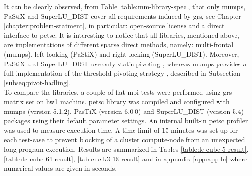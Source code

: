 It can be clearly observed, from Table \ref{table:mm-library-spec}, that only \acrshort{mumps}, PaStiX and SuperLU\_DIST cover all requirements induced by \acrshort{grs}, see Chapter \ref{chapter:problem-statment}, in particular: open-source license and a direct interface to \acrshort{petsc}. It is interesting to notice that all libraries, mentioned above, are implementations of different sparse direct methods, namely: multi-frontal (\acrshort{mumps}), left-looking (PaStiX) and right-locking (SuperLU\_DIST). Moreover, PaStiX and SuperLU\_DIST use only static pivoting \cite{pastix-manual}, \cite{superlu-manual} whereas \acrshort{mumps} provides a full implementation of the threshold pivoting strategy \cite{mumps-manual}, described in Subsection \ref{subseq:pivot-hadling}.\\


To compare the libraries, a couple of flat-\acrshort{mpi} tests were performed using \acrshort{grs} matrix set on \gls{hw1} machine. \acrshort{petsc} library was compiled and configured with \acrshort{mumps} (version 5.1.2), PasTiX (version 6.0.0) and SuperLU\_DIST (version 5.4) packages using their default parameter settings. An internal built-in \acrshort{petsc} profiler was used to measure execution time.  A time limit of 15 minutes was set up for each test-case to prevent blocking of a cluster compute-node from an unexpected long program execution. Results are summarized in Tables \ref{table:lc-cube-5-result}, \ref{table:lc-cube-64-result}, \ref{table:lc-k3-18-result} and in appendix \ref{app:app-lc} where numerical values are given in seconds.\\



